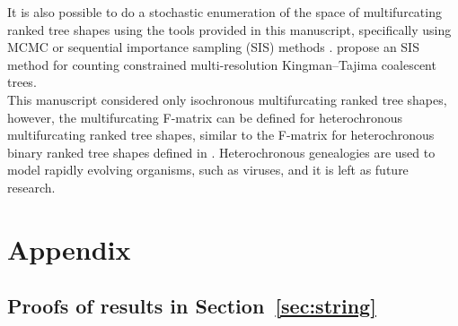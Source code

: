 \documentclass{article}
\begin{document}
It is also possible to do a stochastic enumeration of the space of multifurcating ranked tree shapes using the tools provided in this manuscript, specifically using MCMC or sequential importance sampling (SIS) methods \citep{sinclair2012algorithms}. \cite{cappello2020sequential} propose an SIS method for counting constrained multi-resolution Kingman–Tajima coalescent trees. \\ 

This manuscript considered only isochronous multifurcating ranked tree shapes, however, the multifurcating F-matrix can be defined for heterochronous multifurcating ranked tree shapes, similar to the F-matrix for heterochronous binary ranked tree shapes defined in \cite{Kim2020}. Heterochronous genealogies are used to model rapidly evolving organisms, such as viruses, and it is left as future research. \\


\newpage



\newpage
\section{Appendix}

\subsection{Proofs of results in Section~\ref{sec:string}} \label{subsec:string-proofs}
\end{document}
